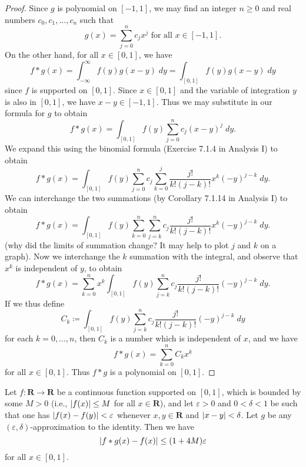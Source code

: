 \begin{proof}
    Since \(g\) is polynomial on \([-1, 1]\), we may find an integer \(n \geq 0\) and real numbers \(c_0, c_1, \dots, c_n\) such that
    \[
        g(x) = \sum_{j = 0}^n c_j x^j \text{ for all } x \in [-1, 1].
    \]
    On the other hand, for all \(x \in [0, 1]\), we have
    \[
        f * g(x) = \int_{-\infty}^\infty f(y) g(x - y) \; dy = \int_{[0, 1]} f(y) g(x - y) \; dy
    \]
    since \(f\) is supported on \([0, 1]\).
    Since \(x \in [0, 1]\) and the variable of integration \(y\) is also in \([0, 1]\), we have \(x - y \in [-1, 1]\).
    Thus we may substitute in our formula for \(g\) to obtain
    \[
        f * g(x) = \int_{[0, 1]} f(y) \sum_{j = 0}^n c_j (x - y)^j \; dy.
    \]
    We expand this using the binomial formula (Exercise 7.1.4 in Analysis I) to obtain
    \[
        f * g(x) = \int_{[0, 1]} f(y) \sum_{j = 0}^n c_j \sum_{k = 0}^j \frac{j!}{k! (j - k)!} x^k (-y)^{j - k} \; dy.
    \]
    We can interchange the two summations (by Corollary 7.1.14 in Analysis I) to obtain
    \[
        f * g(x) = \int_{[0, 1]} f(y) \sum_{k = 0}^n \sum_{j = k}^n c_j \frac{j!}{k! (j - k)!} x^k (-y)^{j - k} \; dy.
    \]
    (why did the limits of summation change? It may help to plot \(j\) and \(k\) on a graph).
    Now we interchange the \(k\) summation with the integral, and observe that \(x^k\) is independent of \(y\), to obtain
    \[
        f * g(x) = \sum_{k = 0}^n x^k \int_{[0, 1]} f(y) \sum_{j = k}^n c_j \frac{j!}{k! (j - k)!} (-y)^{j - k} \; dy.
    \]
    If we thus define
    \[
        C_k \coloneqq \int_{[0, 1]} f(y) \sum_{j = k}^n c_j \frac{j!}{k! (j - k)!} (-y)^{j - k} \; dy
    \]
    for each \(k = 0, \dots, n\), then \(C_k\) is a number which is independent of \(x\), and we have
    \[
        f * g(x) = \sum_{k = 0}^n C_k x^k
    \]
    for all \(x \in [0, 1]\).
    Thus \(f * g\) is a polynomial on \([0, 1]\).
\end{proof}

\begin{lemma}\label{3.8.14}
    Let \(f : \mathbf{R} \to \mathbf{R}\) be a continuous function supported on \([0, 1]\), which is bounded by some \(M > 0\) (i.e., \(\abs*{f(x)} \leq M\) for all \(x \in \mathbf{R}\)), and let \(\varepsilon > 0\) and \(0 < \delta < 1\) be such that one has \(\abs*{f(x) - f(y)} < \varepsilon\) whenever \(x, y \in \mathbf{R}\) and \(\abs*{x - y} < \delta\).
    Let \(g\) be any \((\varepsilon, \delta)\)-approximation to the identity.
    Then we have
    \[
        \abs*{f * g(x) - f(x)} \leq (1 + 4M) \varepsilon
    \]
    for all \(x \in [0, 1]\).
\end{lemma}

